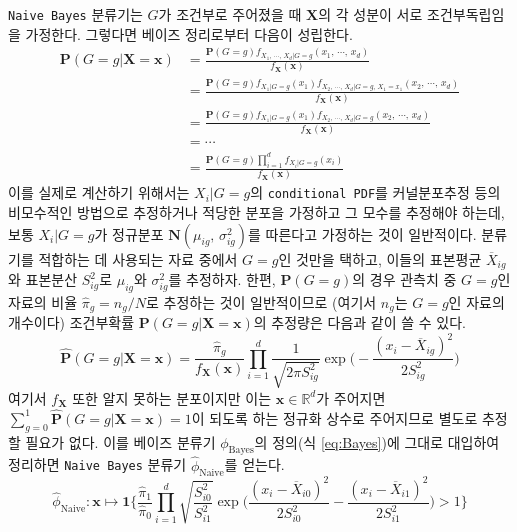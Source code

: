 \documentclass[10pt,onecolumn,twoside,a4size]{gsag3jnl}
\begin{document}
\texttt{Naive Bayes} 분류기는 $G$가 조건부로 주어졌을 때 $\mathbf{X}$의 각 성분이 서로 조건부독립임을 가정한다. 그렇다면 베이즈 정리로부터 다음이 성립한다.
\begin{align}
  \mathbf{P}(G=g\vert\mathbf{X}=\mathbf{x})&=\frac{\mathbf{P}(G=g)f_{X_1,\,\cdots,\,X_d\vert G=g}(x_1,\,\cdots,\,x_d)}{f_{\mathbf{X}}(\mathbf{x})}\nonumber\\
  &=\frac{\mathbf{P}(G=g)f_{X_1\vert G=g}(x_1)f_{X_2,\,\cdots,\,X_d\vert G=g,\,X_1=x_1}(x_2,\,\cdots,\,x_d)}{f_{\mathbf{X}}(\mathbf{x})}\nonumber\\
  &=\frac{\mathbf{P}(G=g)f_{X_1\vert G=g}(x_1)f_{X_2,\,\cdots,\,X_d\vert G=g}(x_2,\,\cdots,\,x_d)}{f_{\mathbf{X}}(\mathbf{x})}\nonumber\\
  &=\cdots\nonumber\\
  &=\frac{\mathbf{P}(G=g)\prod_{i=1}^df_{X_i\vert G=g}(x_i)}{f_{\mathbf{X}}(\mathbf{x})}\nonumber
\end{align}
이를 실제로 계산하기 위해서는 $X_i\vert G=g$의 \texttt{conditional PDF}를 커널분포추정 등의 비모수적인 방법으로 추정하거나 적당한 분포을 가정하고 그 모수를 추정해야 하는데, 보통 $X_i\vert G=g$가 정규분포 $\mathbf{N}(\mu_{ig},\,\sigma_{ig}^2)$를 따른다고 가정하는 것이 일반적이다. 분류기를 적합하는 데 사용되는 자료 중에서 $G=g$인 것만을 택하고, 이들의 표본평균 $\overline{X}_{ig}$와 표본분산 $S_{ig}^2$로 $\mu_{ig}$와 $\sigma_{ig}^2$를 추정하자. 한편, $\mathbf{P}(G=g)$의 경우 관측치 중 $G=g$인 자료의 비율 $\widehat{\pi}_g=n_g/N$로 추정하는 것이 일반적이므로 (여기서 $n_g$는 $G=g$인 자료의 개수이다) 조건부확률 $\mathbf{P}(G=g\vert\mathbf{X}=\mathbf{x})$의 추정량은 다음과 같이 쓸 수 있다.
\begin{equation}
  \widehat{\mathbf{P}}(G=g\vert\mathbf{X}=\mathbf{x})=\frac{\widehat{\pi}_g}{f_{\mathbf{X}}(\mathbf{x})}\prod_{i=1}^d\frac{1}{\sqrt{2\pi S^2_{ig}}}\exp\bigg(-\frac{(x_i-\overline{X}_{ig})^2}{2S^2_{ig}}\bigg)
\end{equation}
여기서 $f_{\mathbf{X}}$ 또한 알지 못하는 분포이지만 이는 $\mathbf{x}\in\mathbb{R}^d$가 주어지면 $\sum_{g=0}^1\widehat{\mathbf{P}}(G=g\vert\mathbf{X}=\mathbf{x})=1$이 되도록 하는 정규화 상수로 주어지므로 별도로 추정할 필요가 없다. 이를 베이즈 분류기 $\phi_\mathrm{Bayes}$의 정의(식 \ref{eq:Bayes})에 그대로 대입하여 정리하면 \texttt{Naive Bayes} 분류기 $\widehat{\phi}_\mathrm{Naive}$를 얻는다.
\begin{equation}
  \widehat{\phi}_\mathrm{Naive}:\mathbf{x}\mapsto\mathbf{1}\bigg\{\frac{\widehat{\pi}_1}{\widehat{\pi}_0}\prod_{i=1}^d\sqrt{\frac{S^2_{i0}}{S^2_{i1}}}\exp\bigg(\frac{(x_i-\overline{X}_{i0})^2}{2S_{i0}^2}-\frac{(x_i-\overline{X}_{i1})^2}{2S_{i1}^2}\bigg)>1\bigg\}
\end{equation}
\end{document}
